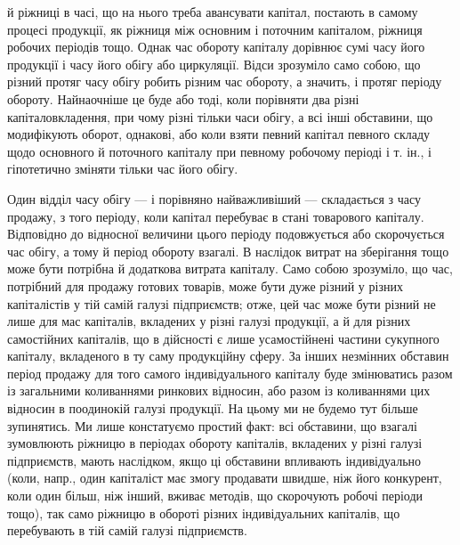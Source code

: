 \parcont{}  %
й ріжниці в часі, що на нього треба авансувати капітал, постають в самому процесі
продукції, як ріжниця між основним і поточним капіталом, ріжниця
робочих періодів тощо. Однак час обороту капіталу дорівнює сумі часу
його продукції і часу його обігу або циркуляції. Відси зрозуміло само
собою, що різний протяг часу обігу робить різним час обороту, а значить,
і протяг періоду обороту. Найнаочніше це буде або тоді, коли
порівняти два різні капіталовкладення, при чому різні тільки часи обігу,
а всі інші обставини, що модифікують оборот, однакові, або коли взяти
певний капітал певного складу щодо основного й поточного капіталу при
певному робочому періоді і т. ін., і гіпотетично зміняти тільки час
його обігу.

Один відділ часу обігу — і порівняно найважливіший — складається з
часу продажу, з того періоду, коли капітал перебуває в стані товарового
капіталу. Відповідно до відносної величини цього періоду подовжується
або скорочується час обігу, а тому й період обороту взагалі. В наслідок
витрат на зберігання тощо може бути потрібна й додаткова витрата капіталу.
Само собою зрозуміло, що час, потрібний для продажу готових
товарів, може бути дуже різний у різних капіталістів у тій самій галузі
підприємств; отже, цей час може бути різний не лише для мас капіталів,
вкладених у різні галузі продукції, а й для різних самостійних капіталів,
що в дійсності є лише усамостійнені частини сукупного капіталу, вкладеного
в ту саму продукційну сферу. За інших незмінних обставин період
продажу для того самого індивідуального капіталу буде змінюватись
разом із загальними коливаннями ринкових відносин, або разом із
коливаннями цих відносин в поодинокій галузі продукції. На цьому ми
не будемо тут більше зупинятись. Ми лише констатуємо простий факт:
всі обставини, що взагалі зумовлюють ріжницю в періодах обороту капіталів,
вкладених у різні галузі підприємств, мають наслідком, якщо ці
обставини впливають індивідуально (коли, напр., один капіталіст має змогу
продавати швидше, ніж його конкурент, коли один більш, ніж інший,
вживає методів, що скорочують робочі періоди тощо), так само ріжницю
в обороті різних індивідуальних капіталів, що перебувають в тій самій
галузі підприємств.

